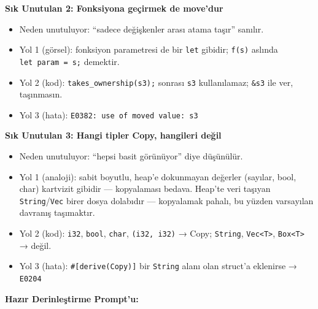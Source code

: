 \documentclass[12pt,a4paper]{article}
\begin{document}
\textbf{Sık Unutulan 2: Fonksiyona geçirmek de move'dur}

\begin{itemize}
\tightlist
\item
  Neden unutuluyor: ``sadece değişkenler arası atama taşır'' sanılır.
\item
  Yol 1 (görsel): fonksiyon parametresi de bir \texttt{let} gibidir; \texttt{f(s)} aslında \texttt{let\ param\ =\ s;} demektir.
\item
  Yol 2 (kod): \texttt{takes\_ownership(s3);} sonrası \texttt{s3} kullanılamaz; \texttt{\&s3} ile ver, taşınmasın.
\item
  Yol 3 (hata): \texttt{E0382:\ use\ of\ moved\ value:\ s3}
\end{itemize}

\textbf{Sık Unutulan 3: Hangi tipler Copy, hangileri değil}

\begin{itemize}
\tightlist
\item
  Neden unutuluyor: ``hepsi basit görünüyor'' diye düşünülür.
\item
  Yol 1 (analoji): sabit boyutlu, heap'e dokunmayan değerler (sayılar, bool, char) kartvizit gibidir --- kopyalaması bedava. Heap'te veri taşıyan \texttt{String}/\texttt{Vec} birer dosya dolabıdır --- kopyalamak pahalı, bu yüzden varsayılan davranış taşımaktır.
\item
  Yol 2 (kod): \texttt{i32}, \texttt{bool}, \texttt{char}, \texttt{(i32,\ i32)} → Copy; \texttt{String}, \texttt{Vec\textless{}T\textgreater{}}, \texttt{Box\textless{}T\textgreater{}} → değil.
\item
  Yol 3 (hata): \texttt{\#{[}derive(Copy){]}} bir \texttt{String} alanı olan struct'a eklenirse → \texttt{E0204}
\end{itemize}

\textbf{Hazır Derinleştirme Prompt'u:}
\end{document}
